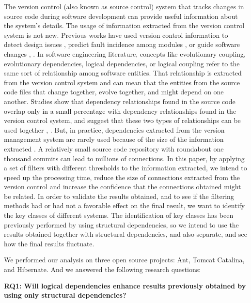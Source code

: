 \documentclass[runningheads]{comsis2}
\begin{document}
The version control (also known as source control) system that tracks changes in source code during software development can provide useful information about the system's details. 
The usage of information extracted from the version control system is not new. Previous works have used version control information to detect design issues \cite{Zimmermann:2004:MVH:998675.999460}, predict fault incidence among modules \cite{Predictingfaultincidence}, \cite{Cataldo2009SoftwareDW} or guide software changes \cite{4815274}, \cite{DBLP:journals/ese/AjienkaCC18}.
In software engineering literature, concepts like evolutionary coupling, evolutionary dependencies, logical dependencies, or logical coupling refer to the same sort of relationship among software entities. That relationship is extracted from the version control system and can mean that the entities from the source code files that change together, evolve together, and might depend on one another. Studies show that dependency relationships found in the source code overlap only in a small percentage with dependency relationships found in the version control system, and suggest that these two types of relationships can be used together \cite{Oliva:2011:ISL:2067853.2068086}, \cite{DBLP:journals/jss/AjienkaC17}. But, in practice, dependencies extracted from the version management system are rarely used because of the size of the information extracted \cite{Shtern:2012:CMS:2332427.2332428}. A relatively small source code repository with roundabout one thousand commits can lead to millions of connections. 
In this paper, by applying a set of filters with different thresholds to the information extracted, we intend to speed up the processing time, reduce the size of connections extracted from the version control and increase the confidence that the connections obtained might be related.
In order to validate the results obtained, and to see if the filtering methods had or had not a favorable effect on the final result, we want to identify the key classes of different systems. The identification of key classes has been previously performed by using structural dependencies, so
we intend to use the results obtained together with structural dependencies, and also separate, and see how the final results fluctuate.

We performed our analysis on three open
source projects: Ant, Tomcat Catalina, and Hibernate. And we answered the following research questions:

\textbf{RQ1: Will logical dependencies enhance results previously obtained by using only structural dependencies?}
\end{document}
